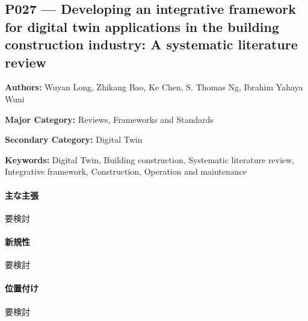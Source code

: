 \subsection{P027 --- Developing an integrative framework for digital twin applications in the building construction industry: A systematic literature review}
\label{paper:P027}
\textbf{Authors:} Wuyan Long, Zhikang Bao, Ke Chen, S. Thomas Ng, Ibrahim Yahaya Wuni\par
\textbf{Major Category:} Reviews, Frameworks and Standards\par
\textbf{Secondary Category:} Digital Twin\par
\textbf{Keywords:} Digital Twin, Building construction, Systematic literature review, Integrative framework, Construction, Operation and maintenance\par
\paragraph{主な主張}
要検討 \cite{Long:2024DTConstructionReview}
\paragraph{新規性}
要検討
\paragraph{位置付け}
要検討
